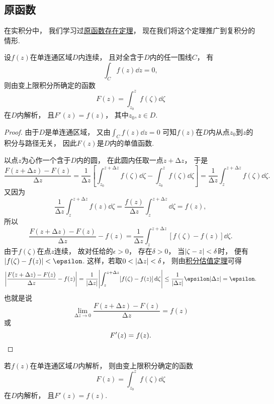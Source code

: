 \subsection{原函数}
在实积分中，
我们学习过\hyperref[theorem:定积分.原函数存在定理]{原函数存在定理}，
现在我们将这个定理推广到复积分的情形.
\begin{theorem}\label{theorem:解析函数的积分表示.原函数1}
设\(f(z)\)在单连通区域\(D\)内连续，
且对全含于\(D\)内的任一围线\(C\)，
有\[
	\int_C f(z) \dd{z} = 0,
\]
则由变上限积分所确定的函数\[
	F(z) = \int_{z_0}^z f(\zeta) \dd{\zeta}
\]在\(D\)内解析，
且\(F'(z) = f(z)\)，
其中\(z_0, z \in D\).
\begin{proof}
由于\(D\)是单连通区域，
又由\(\int_C f(z) \dd{z}=0\)
可知\(f(z)\)在\(D\)内从点\(z_0\)到\(z\)的积分与路径无关，
因此\(F(z)\)是\(D\)内的单值函数.

以点\(z\)为心作一个含于\(D\)内的圆，
在此圆内任取一点\(z+\increment z\)，
于是\[
	\frac{F(z+\increment z)-F(z)}{\increment z}
	= \frac{1}{\increment z}
		\left[
			\int_{z_0}^{z+\increment z} f(\zeta) \dd{\zeta}
			-\int_{z_0}^z f(\zeta) \dd{\zeta}
		\right]
	= \frac{1}{\increment z} \int_z^{z+\increment z} f(\zeta) \dd{\zeta}.
\]
又因为\[
	\frac{1}{\increment z} \int_z^{z+\increment z} f(z) \dd{\zeta}
	= \frac{f(z)}{\increment z} \int_z^{z+\increment z} \dd{\zeta} = f(z),
\]
所以\[
	\frac{F(z+\increment z)-F(z)}{\increment z} - f(z)
	= \frac{1}{\increment z} \int_z^{z+\increment z} [f(\zeta)-f(z)]\dd{\zeta}.
\]
由于\(f(\zeta)\)在点\(z\)连续，
故对任给的\(\epsilon > 0\)，
存在\(\delta > 0\)，
当\(\abs{\zeta - z} < \delta\)时，
便有\(\abs{f(\zeta)-f(z)} < \epsilon\).
这样，若取\(0<\abs{\Delta z}<\delta\)，
则由\hyperref[theorem:解析函数的积分表示.积分估值定理]{积分估值定理}可得\[
	\abs{\frac{F(z+\increment z)-F(z)}{\increment z} - f(z)}
	= \frac{1}{\abs{\increment z}} \abs{ \int_z^{z+\increment z} [f(\zeta)-f(z)]\dd{\zeta} }
	\leq \frac{1}{\abs{\increment z}} \epsilon \abs{\increment z}
	= \epsilon.
\]
也就是说\[
	\lim_{\increment z\to0} \frac{F(z+\increment z)-F(z)}{\increment z} = f(z)
\]或\[
	F'(z) = f(z).
	\qedhere
\]
\end{proof}
\end{theorem}

\begin{corollary}\label{theorem:解析函数的积分表示.原函数2}
若\(f(z)\)在单连通区域\(D\)内解析，
则由变上限积分确定的函数\[
	F(z) = \int_{z_0}^z f(\zeta) \dd{\zeta}
\]在\(D\)内解析，
且\(F'(z) = f(z)\).
\end{corollary}

